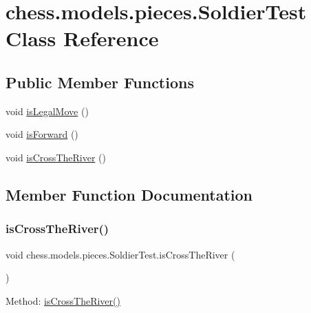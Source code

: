 \hypertarget{classchess_1_1models_1_1pieces_1_1_soldier_test}{}\section{chess.\+models.\+pieces.\+Soldier\+Test Class Reference}
\label{classchess_1_1models_1_1pieces_1_1_soldier_test}
\subsection*{Public Member Functions}
\begin{DoxyCompactItemize}
\item 
void \mbox{\hyperlink{classchess_1_1models_1_1pieces_1_1_soldier_test_ad6deec316336baea729d2c952597cbf7}{is\+Legal\+Move}} ()
\item 
void \mbox{\hyperlink{classchess_1_1models_1_1pieces_1_1_soldier_test_a69e114cbe42f94b7d3d2f5621bdbcd3b}{is\+Forward}} ()
\item 
void \mbox{\hyperlink{classchess_1_1models_1_1pieces_1_1_soldier_test_a3c0c320ad093d44527016c587362d0db}{is\+Cross\+The\+River}} ()
\end{DoxyCompactItemize}


\subsection{Member Function Documentation}
\mbox{\label{classchess_1_1models_1_1pieces_1_1_soldier_test_a3c0c320ad093d44527016c587362d0db}} 
\subsubsection{\texorpdfstring{is\+Cross\+The\+River()}{isCrossTheRiver()}}
{\footnotesize\ttfamily void chess.\+models.\+pieces.\+Soldier\+Test.\+is\+Cross\+The\+River (\begin{DoxyParamCaption}{ }\end{DoxyParamCaption})}

Method\+: \mbox{\hyperlink{classchess_1_1models_1_1pieces_1_1_soldier_test_a3c0c320ad093d44527016c587362d0db}{is\+Cross\+The\+River()}} \mbox{\label{classchess_1_1models_1_1pieces_1_1_soldier_test_a69e114cbe42f94b7d3d2f5621bdbcd3b}} 
